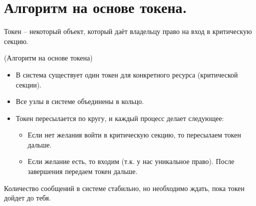 \section{Алгоритм на основе токена.}

\begin{definition}
    Токен -- некоторый объект, который даёт владельцу право на вход в 
    критическую секцию.
\end{definition}

\begin{algorithm}(Алгоритм на основе токена)
\begin{itemize}
    \item В система существует один токен для конкретного ресурса (критической секции).
    \item Все узлы в системе объединены в кольцо.
    \item Токен пересылается по кругу, и каждый процесс делает следующее:
        \begin{itemize}
            \item Если нет желания войти в критическую секцию, то пересылаем токен 
                дальше.
            \item Если желание есть, то входим (т.к. у нас уникальное право).
                После завершения передаем токен дальше.
        \end{itemize}
\end{itemize}
\end{algorithm}

\begin{remark}
    Количество сообщений в системе стабильно, но необходимо ждать, пока токен 
    дойдет до тебя.
\end{remark}
